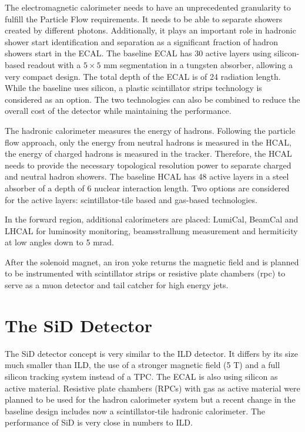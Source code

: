 The electromagnetic calorimeter needs to have an unprecedented granularity to fulfill the Particle Flow requirements. It needs to be able to separate showers created by different photons. Additionally, it plays an important role in hadronic shower start identification and separation as a significant fraction of hadron showers start in the ECAL. The baseline ECAL has 30 active layers using silicon-bas\-ed readout with a $5 \times 5$ mm segmentation in a tungsten absorber, allowing a very compact design. The total depth of the ECAL is of 24 radiation length. While the baseline uses silicon, a plastic scintillator strips technology is considered as an option. The two technologies can also be combined to reduce the overall cost of the detector while maintaining the performance.

The hadronic calorimeter measures the energy of hadrons. Following the particle flow approach, only the energy from neutral hadrons is measured in the HCAL, the energy of charged hadrons is measured in the tracker. Therefore, the HCAL needs to provide the necessary topological resolution power to separate charged and neutral hadron showers. The baseline HCAL has 48 active layers in a steel absorber of a depth of 6 nuclear interaction length. Two options are considered for the active layers: scintillator-tile based and gas-based technologies.

In the forward region, additional calorimeters are placed: LumiCal, BeamCal and LHCAL for luminosity monitoring, beamsstralhung measurement and hermiticity at low angles down to 5 mrad.

After the solenoid magnet, an iron yoke returns the magnetic field and is planned to be instrumented with scintillator strips or resistive plate chambers (\acrshort{rpc}) to serve as a muon detector and tail catcher for high energy jets.

\section{The SiD Detector}

The SiD detector concept is very similar to the ILD detector. It differs by its size much smaller than ILD, the use of a stronger magnetic field (5 T) and a full silicon tracking system instead of a TPC. The ECAL is also using silicon as active material. Resistive plate chambers (RPCs) with gas as active material were planned to be used for the hadron calorimeter system but a recent change in the baseline design includes now a scintillator-tile hadronic calorimeter. The performance of SiD is very close in numbers to ILD.

